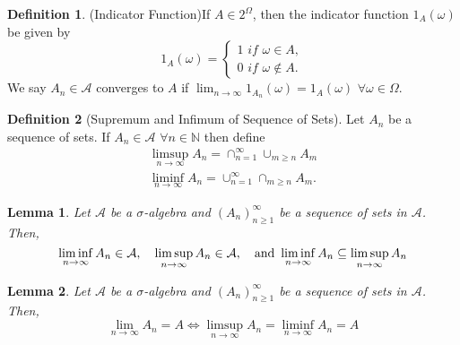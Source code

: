 \documentclass{article}
\newtheorem{lemma}{Lemma}[section]
\theoremstyle{definition}
\newtheorem{definition}{Definition}[section]
\theoremstyle{remark}
\begin{document}
\vspace{.5cm}




\begin{definition}(Indicator Function)\label{def:indicator function}
If $A \in 2^\Omega$, then the indicator function $1_A(\omega)$ be given by
\[
1_A(\omega) = 
\begin{cases}
1 \textit{ if } \omega \in A,\\
0 \textit{ if } \omega \notin A.
\end{cases}
\]
We say $A_n \in \mathcal{A}$ converges to $A$ if $\lim_{n\to\infty}{1_{A_n}(\omega)} = 1_A(\omega)$ $\forall \omega \in \Omega$.
\end{definition}



\vspace{.5cm}



\begin{definition}[Supremum and Infimum of Sequence of Sets]\label{def:sup and inf of sequence of sets}
Let $A_n$ be a sequence of sets. If $A_n \in \mathcal{A}$ $\forall n \in \mathbb{N}$ then define
\begin{gather*}
\limsup_{n\to\infty}{A_n} = \cap^\infty_{n=1}\cup_{m \geq n}{A_m}\\
\liminf_{n\to\infty}{A_n} = \cup^\infty_{n=1}\cap_{m\geq n}{A_m}.
\end{gather*}

\end{definition}


\vspace{.5cm}




\begin{lemma}\label{lem:inf subset of sup}
Let $\mathcal{A}$ be a $\sigma$-algebra and $(A_n)^\infty_{n\geq 1}$ be a sequence 
of sets in $\mathcal{A}$. Then, \[
\liminf_{n\to\infty}{A_n} \in \mathcal{A}, \quad \limsup_{n\to\infty}{A_n} \in \mathcal{A}, \quad \textnormal{and } \liminf_{n\to\infty}{A_n} \subseteq \limsup_{n\to\infty}{A_n}
\]
\end{lemma}


\vspace{.5cm}


\begin{lemma}\label{lem:sup equal inf mean converge}
Let $\mathcal{A}$ be a $\sigma$-algebra and $(A_n)^\infty_{n\geq 1}$ be a sequence 
of sets in $\mathcal{A}$. Then, \[
\lim_{n\to\infty}{A_n}=A \iff \limsup_{n\to\infty}{A_n} = \liminf_{n\to\infty}{A_n} = A
\]
\end{lemma}
\end{document}
